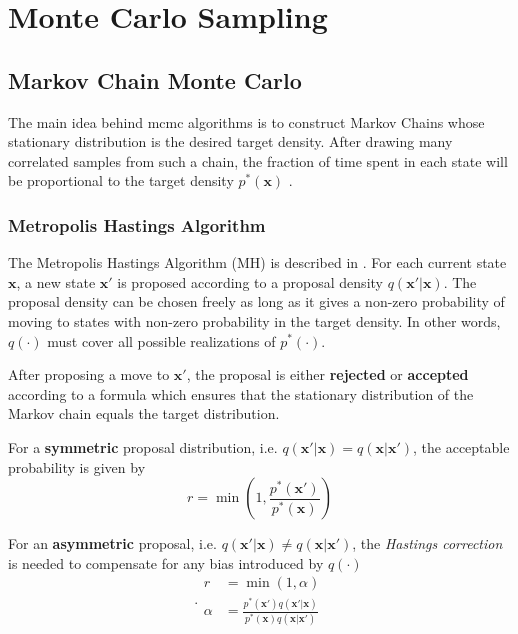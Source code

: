
\chapter{Monte Carlo Sampling}\label{chap:mcmc}

\section{Markov Chain Monte Carlo}
The main idea behind \acrfull{mcmc} algorithms is to construct Markov Chains whose stationary distribution is the desired target density. After drawing many correlated samples from such a chain, the fraction of time spent in each state will be proportional to the target density $p^*(\mathbf{x})$ \cite{murphy}. 

\subsection{Metropolis Hastings Algorithm}
The Metropolis Hastings Algorithm (MH) is described in \cite[p.~850]{murphy}.
For each current state $\mathbf{x}$, a new state $\mathbf{x'}$ is proposed according to a proposal density $q(\mathbf{x'} | \mathbf{x})$. The proposal density can be chosen freely as long as it gives a non-zero probability of moving to states with non-zero probability in the target density. In other words, $q(\cdot)$ must cover all possible realizations of $p^*(\cdot)$. 

After proposing a move to $\mathbf{x'}$, the proposal is either \textbf{rejected} or \textbf{accepted} according to a formula which ensures that the stationary distribution of the Markov chain equals the target distribution. 

For a \textbf{symmetric} proposal distribution, i.e. $q(\mathbf{x'} | \mathbf{x}) = q(\mathbf{x}| \mathbf{x'})$, the acceptable probability is given by 
\begin{equation}
    r = \min(1, \frac{p^*(\mathbf{x'})}{p^*(\mathbf{x})})
\end{equation}

For an \textbf{asymmetric} proposal, i.e. $q(\mathbf{x'} | \mathbf{x}) \neq q(\mathbf{x} | \mathbf{x'})$, the \textit{Hastings correction} is needed to compensate for any bias introduced by $q(\cdot)$
\begin{subequations}.
\begin{align}
    r &= \min(1, \alpha)\\
    \alpha &= \frac{p^*(\mathbf{x'}) q(\mathbf{x'} | \mathbf{x})}{p^*(\mathbf{x}) q(\mathbf{x}| \mathbf{x'})}\label{eq:mcmc_mh_acceptance}
\end{align}
\end{subequations}


